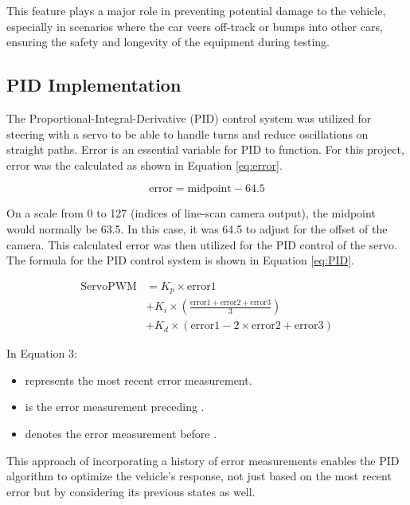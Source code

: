 \documentclass[conference]{IEEEtran}
\begin{document}
This feature plays a major role in preventing potential damage to the vehicle, especially in scenarios where the car veers off-track or bumps into other cars, ensuring the safety and longevity of the equipment during testing.

\subsection{PID Implementation}


The Proportional-Integral-Derivative (PID) control system was utilized for steering with a servo to be able to handle turns and reduce oscillations on straight paths. Error is an essential variable for PID to function. For this project, error was the calculated as shown in Equation \ref{eq:error}.

\begin{equation}
	\text{error} = \text{midpoint} - 64.5 \label{eq:error}
\end{equation}

On a scale from 0 to 127 (indices of line-scan camera output), the midpoint would normally be 63.5. In this case, it was 64.5 to adjust for the offset of the camera. This calculated error was then utilized for the PID control of the servo. The formula for the PID control system is shown in Equation \ref{eq:PID}.

\begin{equation}
	\begin{aligned}
		\text{ServoPWM} &= K_p \times \text{error1} \\
					&+ K_i \times \left( \frac{\text{error1} + \text{error2} + \text{error3}}{3} \right) \\
					&+ K_d \times (\text{error1} - 2 \times \text{error2} + \text{error3})
	\end{aligned}
	\label{eq:PID}
\end{equation}

In Equation 3:
\begin{itemize}
\item {} represents the most recent error measurement.
\item {} is the error measurement preceding .
\item {} denotes the error measurement before .
\end{itemize}
This approach of incorporating a history of error measurements enables the PID algorithm to optimize the vehicle's response, not just based on the most recent error but by considering its previous states as well.
\end{document}
